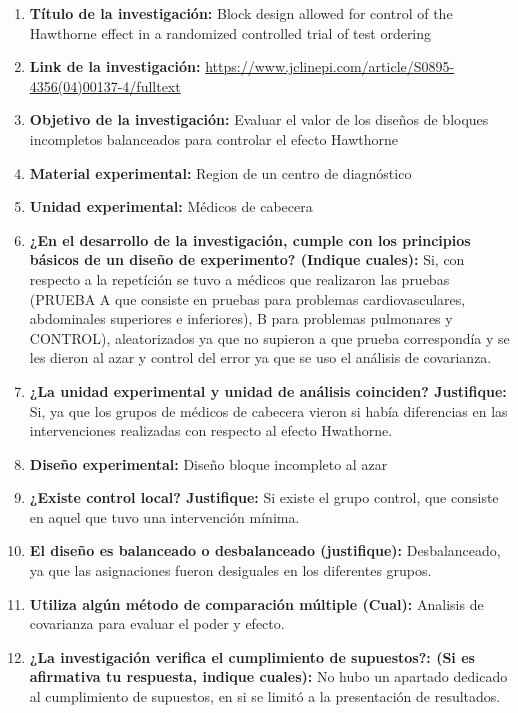 \begin{enumerate}
	\item \textbf{Título de la investigación:} Block design allowed for control of the Hawthorne effect in a randomized controlled trial of test ordering
	\item \textbf{Link de la investigación:} \url{https://www.jclinepi.com/article/S0895-4356(04)00137-4/fulltext}
	\item \textbf{Objetivo de la investigación:} Evaluar el valor de los diseños de bloques incompletos balanceados para controlar el efecto Hawthorne
	\item \textbf{Material experimental:} Region de un centro de diagnóstico
	\item \textbf{Unidad experimental:} Médicos de cabecera
	\item \textbf{¿En el desarrollo de la investigación, cumple con los principios básicos de un diseño de experimento? (Indique cuales):} Si, con respecto a la repetíción se tuvo a médicos que realizaron las pruebas (PRUEBA A que consiste en pruebas para problemas cardiovasculares, abdominales superiores e inferiores), B para problemas pulmonares y CONTROL), aleatorizados ya que no supieron a que prueba correspondía y se les dieron al azar y control del error ya que se uso el análisis de covarianza.
	\item \textbf{¿La unidad experimental y unidad de análisis coinciden? Justifique:} Si, ya que los grupos de médicos de cabecera vieron si había diferencias en las intervenciones realizadas con respecto al efecto Hwathorne.
	\item \textbf{Diseño experimental:} Diseño bloque incompleto al azar
	\item \textbf{¿Existe control local? Justifique:} Si existe el grupo control, que consiste en aquel que tuvo una intervención mínima.
	\item \textbf{El diseño es balanceado o desbalanceado (justifique):} Desbalanceado, ya que las asignaciones fueron desiguales en los diferentes grupos.
	\item \textbf{Utiliza algún método de comparación múltiple (Cual):} Analisis de covarianza para evaluar el poder y efecto.
	\item \textbf{¿La investigación verifica el cumplimiento de supuestos?: (Si es afirmativa tu respuesta, indique cuales):} No hubo un apartado dedicado al cumplimiento de supuestos, en si se limitó a la presentación de resultados.
\end{enumerate}

